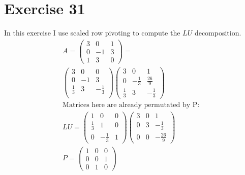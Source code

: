 \section{Exercise 31}
In this exercise I use scaled row pivoting to compute the $LU$ decomposition.
\begin{gather*}
A  = \left( \begin{array}{ccc}
3 & 0 & 1 \\
0 & -1 & 3 \\
1 & 3 & 0
\end{array} \right) = \\
\left( \begin{array}{ccc}
3 & 0 & 0\\
0 & -1 & 3 \\
\frac{1}{3} & 3 & -\frac{1}{3}
\\
\end{array} \right)
\left( \begin{array}{ccc}
3 & 0 & 1\\
0 & -\frac{1}{3} & \frac{26}{9} \\
\frac{1}{3} & 3 & -\frac{1}{3}
\end{array} \right)
\\
\text{Matrices here are already permutated by P: } \\
LU = 
\left( \begin{array}{ccc}
1 & 0 & 0 \\
\frac{1}{3} & 1 & 0 \\
0 & -\frac{1}{3} & 1
\end{array} \right)
\left( \begin{array}{ccc}
3 & 0 & 1\\
0 & 3 & -\frac{1}{3}\\
0 & 0 & -\frac{26}{9}
\end{array} \right)
\\
P = 
\left( \begin{array}{ccc}
1 & 0 & 0\\
0 & 0 & 1 \\
0 & 1 & 0
\end{array} \right)
\end{gather*}
